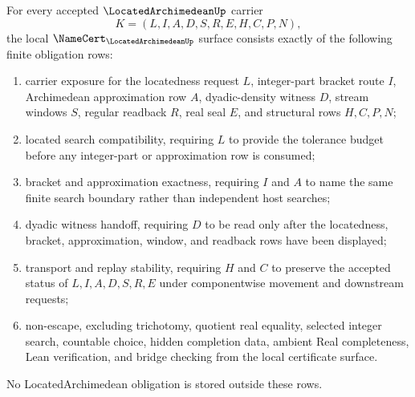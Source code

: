 \begin{theorem}
\label{thm:located-archimedean-namecert-obligations}
For every accepted $\LocatedArchimedeanUp$ carrier
$$
K=(L,I,A,D,S,R,E,H,C,P,N),
$$
the local $\NameCert_{\LocatedArchimedeanUp}$ surface consists exactly of the following finite obligation rows:
\begin{enumerate}
\item carrier exposure for the locatedness request $L$, integer-part bracket route $I$, Archimedean approximation row $A$, dyadic-density witness $D$, stream windows $S$, regular readback $R$, real seal $E$, and structural rows $H,C,P,N$;
\item located search compatibility, requiring $L$ to provide the tolerance budget before any integer-part or approximation row is consumed;
\item bracket and approximation exactness, requiring $I$ and $A$ to name the same finite search boundary rather than independent host searches;
\item dyadic witness handoff, requiring $D$ to be read only after the locatedness, bracket, approximation, window, and readback rows have been displayed;
\item transport and replay stability, requiring $H$ and $C$ to preserve the accepted status of $L,I,A,D,S,R,E$ under componentwise movement and downstream requests;
\item non-escape, excluding trichotomy, quotient real equality, selected integer search, countable choice, hidden completion data, ambient Real completeness, Lean verification, and bridge checking from the local certificate surface.
\end{enumerate}
No LocatedArchimedean obligation is stored outside these rows.
\end{theorem}
